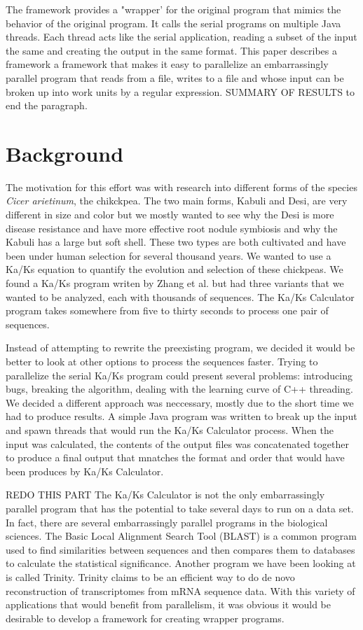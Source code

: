 \documentclass[12pt]{article}
\begin{document}
The framework provides a "wrapper' for the original program that mimics the
behavior of the original program. It calls the serial programs on multiple Java 
threads. Each thread acts like the serial application, reading a subset of the 
input the same and creating the output in the same format. This paper describes
a framework a framework that makes it easy to parallelize an embarrassingly
parallel program that reads from a file, writes to a file and whose input can be
broken up into work units by a regular expression. SUMMARY OF RESULTS to end the
paragraph.

\section{Background}

The motivation for this effort was with research into different forms of the 
species \emph{Cicer arietinum}, the chikckpea. The two main forms, Kabuli and 
Desi, are very different in size and color but we mostly wanted to see why the 
Desi is more disease resistance and have more effective root nodule symbiosis 
and why the Kabuli has a large but soft shell. These two types are both 
cultivated and have been under human selection for several thousand years. We 
wanted to use a Ka/Ks equation to quantify the evolution and selection of these 
chickpeas. We found a Ka/Ks program writen by Zhang et al. \cite{kaks} but had 
three variants that we wanted to be analyzed, each with thousands of sequences. 
The Ka/Ks Calculator program takes somewhere from five to thirty seconds to 
process one pair of sequences. 

Instead of attempting to rewrite the preexisting program, we decided it would be
better to look at other options to process the sequences faster. Trying to 
parallelize the serial Ka/Ks program could present several problems: introducing
bugs, breaking the algorithm, dealing with the learning curve of C++ threading. 
We decided a  different approach was neccessary, mostly due to the short time we
had to produce results. A simple Java program was written to break up the input 
and spawn  threads that would run the Ka/Ks Calculator process. When the input 
was calculated, the contents of the output files was concatenated together to 
produce a final output that mnatches the format and order that would have been
produces by Ka/Ks Calculator.

REDO THIS PART
The Ka/Ks Calculator is not the only embarrassingly parallel program that has the
potential to take several days to run on a data set. In fact, there are several
embarrassingly parallel programs in the biological sciences. The Basic Local
Alignment Search Tool (BLAST) \cite{BLAST} is a common program used to find
similarities between sequences and then compares them to databases to calculate
the statistical significance. Another program we have been looking at is called
Trinity. Trinity claims to be an efficient way to do de novo reconstruction of
transcriptomes from mRNA sequence data. With this variety of applications that 
would benefit from parallelism, it was obvious it would be desirable to develop
a framework for creating wrapper programs.
\end{document}
